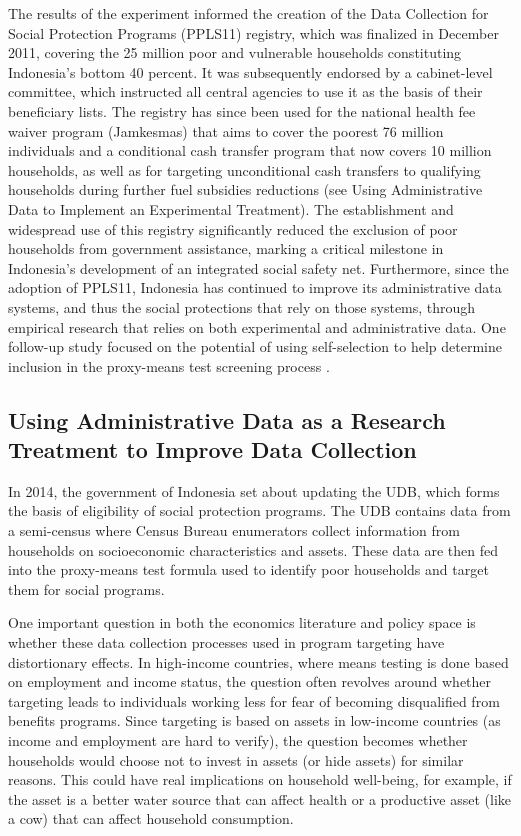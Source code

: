 The results of the experiment informed the creation of the Data Collection for Social Protection Programs (PPLS11) registry, which was finalized in December 2011, covering the 25 million poor and vulnerable households constituting Indonesia's bottom 40 percent. It was subsequently endorsed by a cabinet-level committee, which instructed all central agencies to use it as the basis of their beneficiary lists. The registry has since been used for the national health fee waiver program (Jamkesmas) that aims to cover the poorest 76 million individuals and a conditional cash transfer program that now covers 10 million households, as well as for targeting unconditional cash transfers to qualifying households during further fuel subsidies reductions (see Using Administrative Data to Implement an Experimental Treatment). The establishment and widespread use of this registry significantly reduced the exclusion of poor households from government assistance, marking a critical milestone in Indonesia's development of an integrated social safety net. Furthermore, since the adoption of PPLS11, Indonesia has continued to improve its administrative data systems, and thus the social protections that rely on those systems, through empirical research that relies on both experimental and administrative data. One follow-up study focused on the potential of using self-selection to help determine inclusion in the proxy-means test screening process \citep{alatas2016}.

\hypertarget{using-administrative-data-as-a-research-treatment-to-improve-data-collection}{%
\subsection{Using Administrative Data as a Research Treatment to Improve Data Collection}\label{using-administrative-data-as-a-research-treatment-to-improve-data-collection}}

In 2014, the government of Indonesia set about updating the UDB, which forms the basis of eligibility of social protection programs. The UDB contains data from a semi-census where Census Bureau enumerators collect information from households on socioeconomic characteristics and assets. These data are then fed into the proxy-means test formula used to identify poor households and target them for social programs.

One important question in both the economics literature and policy space is whether these data collection processes used in program targeting have distortionary effects. In high-income countries, where means testing is done based on employment and income status, the question often revolves around whether targeting leads to individuals working less for fear of becoming disqualified from benefits programs. Since targeting is based on assets in low-income countries (as income and employment are hard to verify), the question becomes whether households would choose not to invest in assets (or hide assets) for similar reasons. This could have real implications on household well-being, for example, if the asset is a better water source that can affect health or a productive asset (like a cow) that can affect household consumption.

